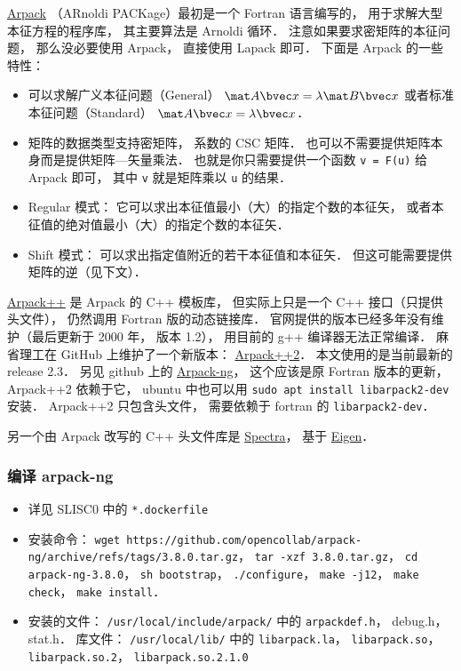 

\href{https://www.caam.rice.edu/software/ARPACK/}{Arpack} （ARnoldi PACKage）最初是一个 Fortran 语言编写的， 用于求解大型本征方程的程序库， 其主要算法是 Arnoldi 循环． 注意如果要求密矩阵的本征问题， 那么没必要使用 Arpack， 直接使用 Lapack 即可． 下面是 Arpack 的一些特性：
\begin{itemize}
\item 可以求解广义本征问题（General） $\mat A\bvec x = \lambda \mat B\bvec x$ 或者标准本征问题（Standard） $\mat A\bvec x = \lambda \bvec x$．
\item 矩阵的数据类型支持密矩阵， 系数的 CSC 矩阵． 也可以不需要提供矩阵本身而是提供矩阵—矢量乘法． 也就是你只需要提供一个函数 \verb|v = F(u)| 给 Arpack 即可， 其中 \verb|v| 就是矩阵乘以 \verb|u| 的结果．
\item Regular 模式： 它可以求出本征值最小（大）的指定个数的本征矢， 或者本征值的绝对值最小（大）的指定个数的本征矢．
\item Shift 模式： 可以求出指定值附近的若干本征值和本征矢． 但这可能需要提供矩阵的逆（见下文）．
\end{itemize}

\href{http://www.ime.unicamp.br/~chico/arpack++/}{Arpack++} 是 Arpack 的 C++ 模板库， 但实际上只是一个 C++ 接口（只提供头文件）， 仍然调用 Fortran 版的动态链接库． 官网提供的版本已经多年没有维护（最后更新于 2000 年， 版本 1.2）， 用目前的 g++ 编译器无法正常编译． 麻省理工在 GitHub 上维护了一个新版本： \href{https://github.com/m-reuter/arpackpp}{Arpack++2}． 本文使用的是当前最新的 release 2.3． 另见 github 上的 \href{https://github.com/opencollab/arpack-ng}{Arpack-ng}， 这个应该是原 Fortran 版本的更新， Arpack++2 依赖于它， ubuntu 中也可以用 \verb|sudo apt install libarpack2-dev| 安装． Arpack++2 只包含头文件， 需要依赖于 fortran 的 \verb|libarpack2-dev|．

另一个由 Arpack 改写的 C++ 头文件库是 \href{https://spectralib.org/}{Spectra}， 基于 \href{https://eigen.tuxfamily.org/index.php?title=Main_Page}{Eigen}．

\subsubsection{编译 arpack-ng}
\begin{itemize}
\item 详见 SLISC0 中的 \verb|*.dockerfile|
\item 安装命令： \verb|wget https://github.com/opencollab/arpack-ng/archive/refs/tags/3.8.0.tar.gz|， \verb|tar -xzf 3.8.0.tar.gz|， \verb|cd arpack-ng-3.8.0|， \verb|sh bootstrap|， \verb|./configure|， \verb|make -j12|， \verb|make check|， \verb|make install|．
\item 安装的文件： \verb|/usr/local/include/arpack/| 中的 \verb|arpackdef.h|， debug.h， stat.h． 库文件： \verb|/usr/local/lib/| 中的 \verb|libarpack.la|， \verb|libarpack.so|， \verb|libarpack.so.2|， \verb|libarpack.so.2.1.0|
\end{itemize}

